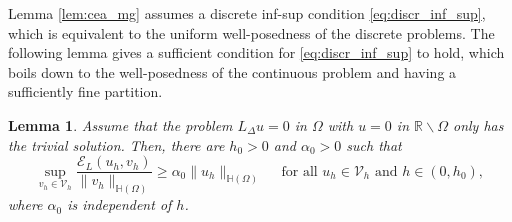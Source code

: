 \documentclass[11 pt]{article}
\newtheorem{lemma}[theorem]{Lemma}
\numberwithin{equation}{section}
\def\R{\mathbb{R}}
\def\cE{\mathcal{E}}
\begin{document}
Lemma \ref{lem:cea_mg} assumes a discrete inf-sup condition \eqref{eq:discr_inf_sup}, which is equivalent to the uniform well-posedness of the discrete problems.  The following lemma gives a sufficient condition for \eqref{eq:discr_inf_sup} to hold, which boils down to the well-posedness of the continuous problem and having a sufficiently fine partition.


\begin{lemma}
Assume that the problem $L_\Delta u=0$ in $\Omega$ with $u=0$ in $\R\backslash  \Omega$ only has the trivial solution.  Then, there are $h_0>0$ and $\alpha_0>0$ such that
\begin{equation*}
    \sup_{v_h\in \mathcal V_h}\frac{\cE_{L}(u_h,v_h)}{\|v_h\|_{\mathbb H(\Omega)}}\geq \alpha_0\|u_h\|_{\mathbb H(\Omega)} \quad\text{ for all } u_h\in\mathcal V_h \text{ and }h\in(0,h_0),
\end{equation*}
where $\alpha_0$ is independent of $h$.
\end{lemma}
\end{document}
